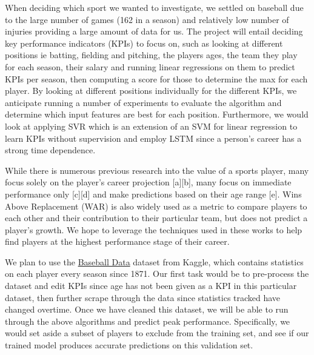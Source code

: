 \documentclass{article}
\begin{document}
When deciding which sport we wanted to investigate, we settled on baseball due to the large number of games (162 in a season) and relatively low number of injuries providing a large amount of data for us.  The project will entail deciding key performance indicators (KPIs) to focus on, such as looking at different positions ie batting, fielding and pitching, the players ages, the team they play for each season, their salary and running linear regressions on them to predict KPIs per season, then computing a score for those to determine the max for each player. By looking at different positions individually for the different KPIs, we anticipate running a number of experiments to evaluate the algorithm and determine which input features are best for each position.
Furthermore, we would look at applying SVR which is an extension of an SVM for linear regression to learn KPIs without supervision and employ LSTM since a person's career has a strong time dependence.

While there is numerous previous research into the value of a sports player, many focus solely on the player's career projection [a][b], many focus on immediate performance only [c][d] and make predictions based on their age range [e]. Wins Above Replacement (WAR) is also widely used as a metric to compare players to each other and their contribution to their particular team, but does not predict a player's growth.  We hope to leverage the techniques used in these works to help find players at the highest performance stage of their career. %

We plan to use the \href{https://www.kaggle.com/arashnic/baseballdatabank}{Baseball Data} dataset from Kaggle, which contains statistics on each player every season since 1871. Our first task would be to pre-process the dataset and edit KPIs since age has not been given as a KPI in this particular dataset, then further scrape through the data since statistics tracked have changed overtime. Once we have cleaned this dataset, we will be able to run through the above algorithms and predict peak performance. Specifically, we would set aside a subset of players to exclude from the training set, and see if our trained model produces accurate predictions on this validation set.
\end{document}
